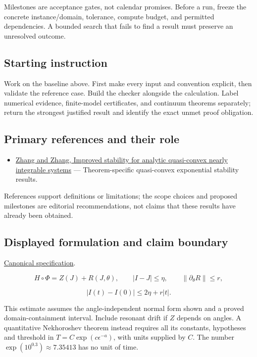 \documentclass[
  11pt,
]{article}
\providecommand{\tightlist}{%
  \setlength{\itemsep}{0pt}\setlength{\parskip}{0pt}}
\begin{document}
Milestones are acceptance gates, not calendar promises. Before a run,
freeze the concrete instance/domain, tolerance, compute budget, and
permitted dependencies. A bounded search that fails to find a result
must preserve an unresolved outcome.

\subsection{Starting instruction}

Work on the baseline above. First make every input and convention
explicit, then validate the reference case. Build the checker alongside
the calculation. Label numerical evidence, finite-model certificates,
and continuum theorems separately; return the strongest justified result
and identify the exact unmet proof obligation.

\subsection{Primary references and their role}

\begin{itemize}
\tightlist
\item
  \href{https://arxiv.org/abs/1701.06026}{Zhang and Zhang, Improved
  stability for analytic quasi-convex nearly integrable systems} ---
  Theorem-specific quasi-convex exponential stability results.
\end{itemize}

References support definitions or limitations; the scope choices and
proposed milestones are editorial recommendations, not claims that these
results have already been obtained.

\subsection{Displayed formulation and claim boundary}

\href{https://github.com/rick-stevens-ai/Pure-Thought/blob/main/PRDs/28-Nekhoroshev-Stability-Theory.md}{Canonical
specification}.

\[H\circ\Phi=Z(J)+R(J,\theta),\qquad
|I-J|\le\eta,\qquad\|\partial_\theta R\|\le r,\]

\[|I(t)-I(0)|\le2\eta+r|t|.\]

This estimate assumes the angle-independent normal form shown and a
proved domain-containment interval. Include resonant drift if \(Z\)
depends on angles. A quantitative Nekhoroshev theorem instead requires
all its constants, hypotheses and threshold in
\(T=C\exp(c\epsilon^{-a})\), with units supplied by \(C\). The number
\(\exp(10^{0.3})\approx7.35413\) has no unit of time.
\end{document}
